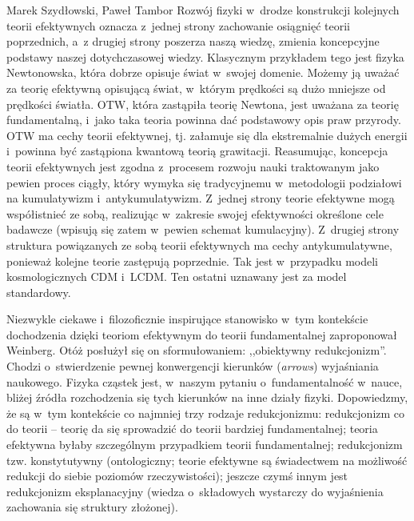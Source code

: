 \begin{artplenv2auth}{Marek Szydłowski, Paweł Tambor}
Rozwój fizyki w~drodze konstrukcji kolejnych teorii efektywnych oznacza z~jednej strony zachowanie osiągnięć teorii poprzednich, a~z drugiej strony poszerza naszą wiedzę, zmienia koncepcyjne podstawy naszej dotychczasowej wiedzy. Klasycznym przykładem tego jest fizyka Newtonowska, która dobrze opisuje świat w~swojej domenie. Możemy ją uważać za teorię efektywną opisującą świat, w~którym prędkości są dużo mniejsze od prędkości światła. OTW, która zastąpiła teorię Newtona, jest uważana za teorię fundamentalną, i~jako taka teoria powinna dać podstawowy opis praw przyrody. OTW ma cechy teorii efektywnej, tj. załamuje się dla ekstremalnie dużych energii i~powinna być zastąpiona kwantową teorią grawitacji. Reasumując, koncepcja teorii efektywnych jest zgodna z~procesem rozwoju nauki traktowanym jako pewien proces ciągły, który wymyka się tradycyjnemu w~metodologii podziałowi na kumulatywizm i~antykumulatywizm. Z~jednej strony teorie efektywne mogą współistnieć ze sobą, realizując w~zakresie swojej efektywności określone cele badawcze (wpisują się zatem w~pewien schemat kumulacyjny). Z~drugiej strony struktura powiązanych ze sobą teorii efektywnych ma cechy antykumulatywne, ponieważ kolejne teorie zastępują poprzednie. Tak jest w~przypadku modeli kosmologicznych CDM i~LCDM. Ten ostatni uznawany jest za model standardowy.

Niezwykle ciekawe i~filozoficznie inspirujące stanowisko w~tym kontekście dochodzenia dzięki teoriom efektywnym do teorii fundamentalnej zaproponował Weinberg. Otóż posłużył się on sformułowaniem: ,,obiektywny redukcjonizm''. Chodzi o~stwierdzenie pewnej konwergencji kierunków (\textit{arrows}) wyjaśniania naukowego. Fizyka cząstek jest, w~naszym pytaniu o~fundamentalność w~nauce, bliżej źródła rozchodzenia się tych kierunków na inne działy fizyki. Dopowiedzmy, że są w~tym kontekście co najmniej trzy rodzaje redukcjonizmu: redukcjonizm co do teorii -- teorię da się sprowadzić do teorii bardziej fundamentalnej; teoria efektywna byłaby szczególnym przypadkiem teorii fundamentalnej; redukcjonizm tzw. konstytutywny (ontologiczny; teorie efektywne są świadectwem na możliwość redukcji do siebie poziomów rzeczywistości); jeszcze czymś innym jest redukcjonizm eksplanacyjny (wiedza o~składowych wystarczy do wyjaśnienia zachowania się struktury złożonej).


\end{artplenv2auth}
